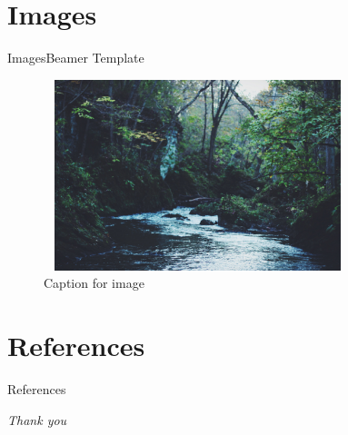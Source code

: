 \documentclass[hyperref={pdfpagemode=UseOutlines}]{beamer}
\numberwithin{equation}{mycounter} %
\numberwithin{table}{mycounter}
\begin{document}
\section{Images}
\begin{frame}{Images}{Beamer Template}
    \begin{figure}
        \begin{minipage}{\textwidth}
            \centering
            \includegraphics[width=0.8\textwidth,height=15em]{stream.jpg}
            \caption{Caption for image}
            \label{fig:sample_figure}
        \end{minipage}
    \end{figure}
\end{frame}

\section{References}
\begin{frame}[allowframebreaks]{References}
    \nocite{*}
    \printbibliography
\end{frame}

\begin{frame}
    \centering \Large
    \emph{Thank you}
\end{frame}
\end{document}

